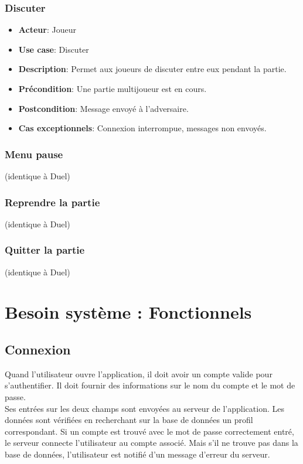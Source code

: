 \documentclass{article}
\begin{document}
\subsubsection*{Discuter}
\begin{itemize}
    \item \textbf{Acteur}: Joueur
    \item \textbf{Use case}: Discuter
    \item \textbf{Description}: Permet aux joueurs de discuter entre eux pendant la partie.
    \item \textbf{Précondition}: Une partie multijoueur est en cours.
    \item \textbf{Postcondition}: Message envoyé à l'adversaire.
    \item \textbf{Cas exceptionnels}: Connexion interrompue, messages non envoyés.
\end{itemize}

\subsubsection*{Menu pause} (identique à Duel)
\subsubsection*{Reprendre la partie} (identique à Duel)
\subsubsection*{Quitter la partie} (identique à Duel)

\newpage

\section{Besoin système : Fonctionnels}

\subsection{Connexion}

\quad Quand l'utilisateur ouvre l'application, il doit avoir un compte valide pour s'authentifier. Il doit fournir des informations sur le nom du compte et le mot de passe.\\
Ses entrées sur les deux champs sont envoyées au serveur de l'application. Les données sont vérifiées en recherchant sur la base de données un profil correspondant. Si un compte est trouvé avec le mot de passe correctement entré, le serveur connecte l'utilisateur au compte associé. Mais s'il ne trouve pas dans la base de données, l'utilisateur est notifié d'un message d'erreur du serveur.
\end{document}
